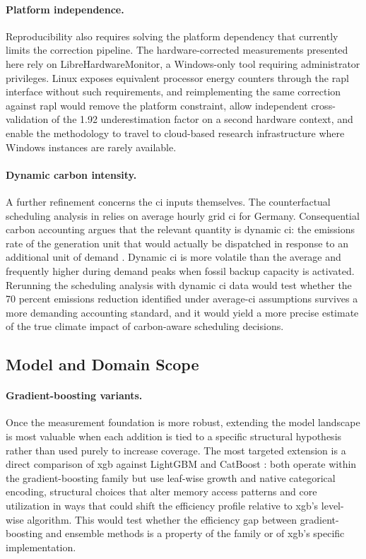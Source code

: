 \paragraph{Platform independence.}
Reproducibility also requires solving the platform dependency that currently limits the correction pipeline. The hardware-corrected measurements presented here rely on LibreHardwareMonitor, a Windows-only tool requiring administrator privileges. Linux exposes equivalent processor energy counters through the \gls{rapl} interface without such requirements, and reimplementing the same correction against \gls{rapl} would remove the platform constraint, allow independent cross-validation of the 1.92 underestimation factor on a second hardware context, and enable the methodology to travel to cloud-based research infrastructure where Windows instances are rarely available.

\paragraph{Dynamic carbon intensity.}
A further refinement concerns the \gls{ci} inputs themselves. The counterfactual scheduling analysis in  relies on average hourly grid \gls{ci} for Germany. Consequential carbon accounting argues that the relevant quantity is dynamic \gls{ci}: the emissions rate of the generation unit that would actually be dispatched in response to an additional unit of demand \cite{dodgeMeasuringCarbonIntensity2022}. Dynamic \gls{ci} is more volatile than the average and frequently higher during demand peaks when fossil backup capacity is activated. Rerunning the scheduling analysis with dynamic \gls{ci} data would test whether the 70 percent emissions reduction identified under average-\gls{ci} assumptions survives a more demanding accounting standard, and it would yield a more precise estimate of the true climate impact of carbon-aware scheduling decisions.

\subsection{Model and Domain Scope}

\paragraph{Gradient-boosting variants.}
Once the measurement foundation is more robust, extending the model landscape is most valuable when each addition is tied to a specific structural hypothesis rather than used purely to increase coverage. The most targeted extension is a direct comparison of \gls{xgb} against LightGBM \cite{keLightGBMHighlyEfficient2017} and CatBoost \cite{prokhorenkovaCatBoostUnbiasedBoosting2018}: both operate within the gradient-boosting family but use leaf-wise growth and native categorical encoding, structural choices that alter memory access patterns and core utilization in ways that could shift the efficiency profile relative to \gls{xgb}'s level-wise algorithm. This would test whether the efficiency gap between gradient-boosting and ensemble methods is a property of the family or of \gls{xgb}'s specific implementation.

